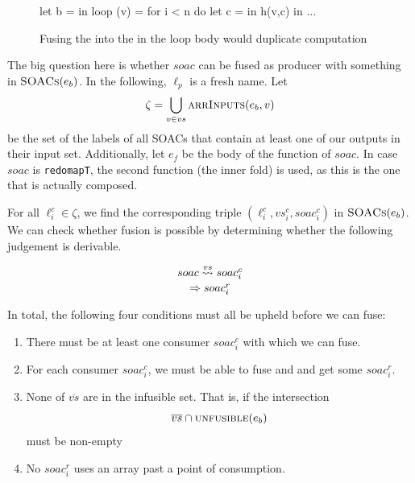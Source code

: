 \begin{description}[style=nextline]
\begin{figure}
\begin{center}
\begin{bcolorcode}
let b =  in
loop (v) = for i < n do
             let c =  in
             h(v,c) in
...
\end{bcolorcode}
\end{center}
\caption{Fusing the  into the  in the loop body would duplicate computation}
\label{fig:cannot-fuse-loop}
\end{figure}

\item[Case $e \equiv \texttt{let \{$\overline{vs}$\} = $soac$ in $e_{b}$}$]

  The big question here is whether $soac$ can be fused as producer
  with something in $\textsc{SOACs}(e_{b})$.  In the following, $\ell_{p}$ is
  a fresh name.  Let
  \[
  \zeta = \bigcup_{v \in vs} \textsc{arrInputs}(e_{b},v)
  \]
  be the set of the labels of all SOACs that contain at least one of
  our outputs in their input set.  Additionally, let $e_{f}$ be the
  body of the function of $soac$.  In case $soac$ is
  \texttt{redomapT}, the second function (the inner fold) is used, as
  this is the one that is actually composed.

  For all $\ell^{c}_{i} \in \zeta$, we find the corresponding triple
  $(\ell^{c}_{i},vs^{c}_{i},soac^{c}_{i})$ in $\textsc{SOACs}(e_{b})$.  We can check
  whether fusion is possible by determining whether the following
  judgement is derivable.

\[
   \fusesto
    {vs}
    {soac}
    {soac^{c}_{i}}
    {soac^{r}_{i}}
\]

In total, the following four conditions must all be upheld before we
can fuse:

\begin{enumerate}
\item There must be at least one consumer $soac^{c}_{i}$ with which we can fuse.
\item For each consumer $soac^{c}_{i}$, we must be able to fuse and
  and get some $soac^{r}_{i}$.
\item None of $\overline{vs}$ are in the infusible set.  That is, if the intersection
\[
\overline{vs} \cap \textsc{unfusible}(e_{b})
\]
must be non-empty
\item No $soac^{r}_{i}$ uses an array past a point of consumption. 
\end{enumerate}


\end{description}
